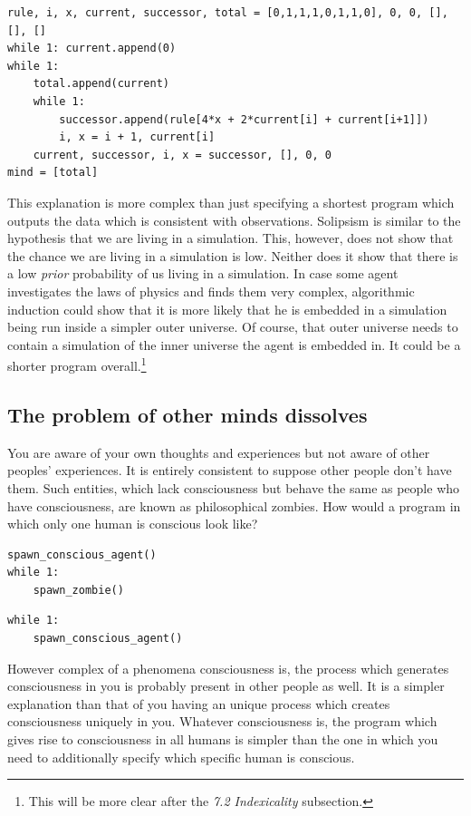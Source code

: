\documentclass[oneside,hidelinks]{article}
\begin{document}
\begin{lstlisting}[caption={A solipsistic program.}]
rule, i, x, current, successor, total = [0,1,1,1,0,1,1,0], 0, 0, [], [], []
while 1: current.append(0)
while 1:
	total.append(current)
	while 1:
		successor.append(rule[4*x + 2*current[i] + current[i+1]])
		i, x = i + 1, current[i]
	current, successor, i, x = successor, [], 0, 0
mind = [total]
\end{lstlisting}

This explanation is more complex than just specifying a shortest program which outputs the data which is consistent with observations.
Solipsism is similar to the hypothesis that we are living in a simulation.
This, however, does not show that the chance we are living in a simulation is low.
Neither does it show that there is a low \textit{prior} probability of us living in a simulation.
In case some agent investigates the laws of physics and finds them very complex, algorithmic induction could show that it is more likely that he is embedded in a simulation being run inside a simpler outer universe.
Of course, that outer universe needs to contain a simulation of the inner universe the agent is embedded in.
It could be a shorter program overall.\footnote{
This will be more clear after the \textit{7.2 Indexicality} subsection.
}

\newpage

\subsection{The problem of other minds dissolves}

You are aware of your own thoughts and experiences but not aware of other peoples' experiences.
It is entirely consistent to suppose other people don't have them.
Such entities, which lack consciousness but behave the same as people who have consciousness, are known as philosophical zombies.
How would a program in which only one human is conscious look like?

\begin{lstlisting}[caption={A zombie-filled program with one conscious agent.}]
spawn_conscious_agent()
while 1:
	spawn_zombie()
\end{lstlisting}

\begin{lstlisting}[caption={A more probable program.}]
while 1:
	spawn_conscious_agent()
\end{lstlisting}

However complex of a phenomena consciousness is, the process which generates consciousness in you is probably present in other people as well.
It is a simpler explanation than that of you having an unique process which creates consciousness uniquely in you.
Whatever consciousness is, the program which gives rise to consciousness in all humans is simpler than the one in which you need to additionally specify which specific human is conscious.
\end{document}
